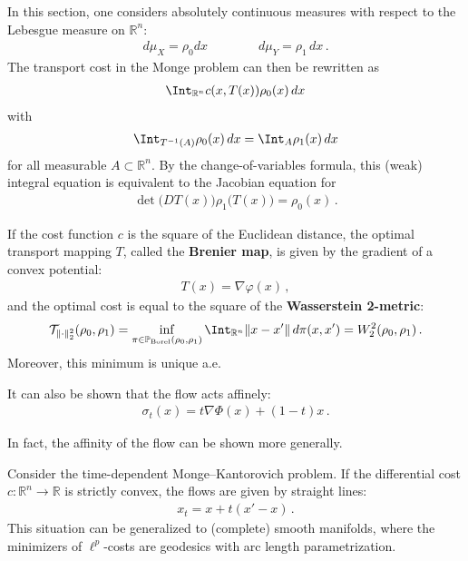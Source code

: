     In this section, one considers absolutely continuous measures with respect to the Lebesgue measure on $\mathbb{R}^n$:
    \begin{gather}
        d\mu_X = \rho_0dx\qquad\qquad d\mu_Y = \rho_1\,dx\,.
    \end{gather}
    The transport cost in the Monge problem can then be rewritten as
    \begin{gather}
        \Int_{\mathbb{R}^n}c(x,T(x))\rho_0(x)\,dx
    \end{gather}
    with
    \begin{gather}
        \Int_{T^{-1}(A)}\rho_0(x)\,dx = \Int_A\rho_1(x)\,dx
    \end{gather}
    for all measurable $A\subset\mathbb{R}^n$. By the change-of-variables formula, this (weak) integral equation is equivalent to the Jacobian equation for
    \begin{gather}
        \det\bigl(DT(x)\bigr)\rho_1\bigl(T(x)\bigr)=\rho_0(x)\,.
    \end{gather}

    \begin{example}
        If the cost function $c$ is the square of the Euclidean distance, the optimal transport mapping $T$, called the \textbf{Brenier map}, is given by the gradient of a convex potential:
        \begin{gather}
            T(x) = \nabla\varphi(x)\,,
        \end{gather}
        and the optimal cost is equal to the square of the \textbf{Wasserstein 2-metric}:
        \begin{gather}
            \mathcal{T}_{\|\cdot\|_2^2}(\rho_0,\rho_1) = \inf_{\pi\in\mathbb{P}_{\text{Borel}}(\rho_0,\rho_1)}\Int_{\mathbb{R}^n}\|x-x'\|\,d\pi(x,x')=W^2_2(\rho_0,\rho_1)\,.
        \end{gather}
        Moreover, this minimum is unique a.e.

        It can also be shown that the flow acts affinely:
        \begin{gather}
            \sigma_t(x) = t\nabla\Phi(x) + (1-t)x\,.
        \end{gather}
    \end{example}

    In fact, the affinity of the flow can be shown more generally.
    \begin{property}
        Consider the time-dependent Monge--Kantorovich problem. If the differential cost $c:\mathbb{R}^n\rightarrow\mathbb{R}$ is strictly convex, the flows are given by straight lines:
        \begin{gather}
            x_t = x + t(x'-x)\,.
        \end{gather}
        This situation can be generalized to (complete) smooth manifolds, where the minimizers of $\ell^p$-costs are geodesics with arc length parametrization.
    \end{property}

